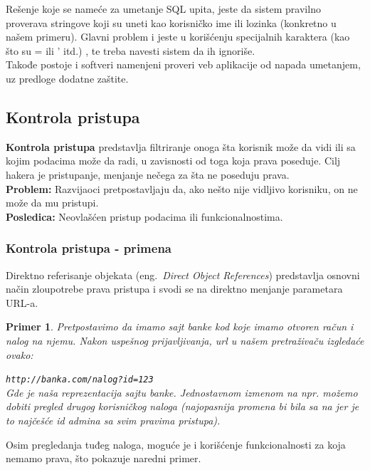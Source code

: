 \documentclass[a4paper]{article}
\newtheorem{primer}{Primer}[section]
\begin{document}
Rešenje koje se nameće za umetanje SQL upita, jeste da sistem pravilno proverava stringove koji su uneti kao korisničko ime ili lozinka (konkretno u našem primeru). Glavni problem i jeste u korišćenju specijalnih karaktera (kao što su = ili ' itd.) \cite{SQL_prev}, te treba navesti sistem da ih ignoriše.\cite{Sanit}\\
Takođe postoje i softveri namenjeni proveri  veb aplikacije od napada umetanjem, uz predloge dodatne zaštite.

\subsection{Kontrola pristupa}

\textbf{Kontrola pristupa} \cite{AC} predstavlja filtriranje onoga šta korisnik može da vidi ili sa kojim podacima može da radi,  u zavisnosti od toga koja prava poseduje. Cilj hakera je pristupanje, menjanje nečega za šta ne poseduju prava.\\
\textbf{Problem:} Razvijaoci pretpostavljaju da, ako nešto nije vidljivo korisniku, on ne može da mu pristupi.\\
\textbf{Posledica:} Neovlašćen pristup podacima ili funkcionalnostima.

\subsubsection{Kontrola pristupa - primena}

Direktno referisanje objekata (eng.~{\em Direct Object References}) predstavlja osnovni način zloupotrebe prava pristupa i svodi se na direktno menjanje parametara URL-a.
\begin{primer}
\label{primer3}
Pretpostavimo da imamo sajt banke kod koje imamo otvoren račun i nalog na njemu. Nakon uspešnog prijavljivanja, url u našem pretraživaču izgledaće ovako:

\texttt{http://banka.com/nalog?id=123}\\
Gde je  naša reprezentacija sajtu banke. Jednostavnom izmenom  na npr.  možemo dobiti pregled drugog korisničkog naloga (najopasnija promena bi bila sa  na  jer je to najčešće id admina sa svim pravima pristupa).
\end{primer}

Osim pregledanja tuđeg naloga, moguće je i korišćenje funkcionalnosti za koja nemamo prava, što pokazuje naredni primer.
\end{document}
